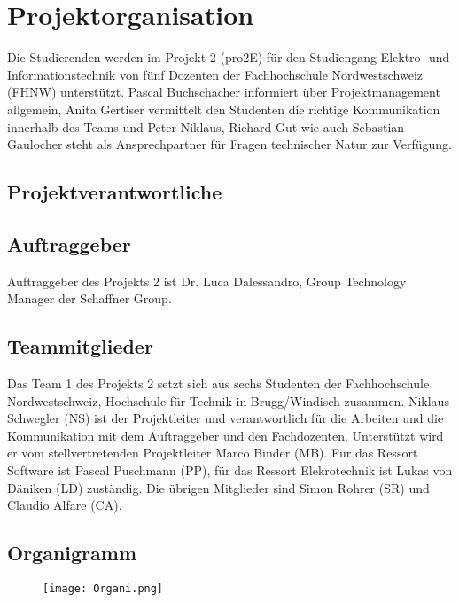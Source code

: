 \section{Projektorganisation}

Die Studierenden werden im Projekt 2 (pro2E) für den Studiengang Elektro- und Informationstechnik von fünf Dozenten der Fachhochschule Nordwestschweiz (FHNW) unterstützt. Pascal Buchschacher informiert über Projektmanagement allgemein, Anita Gertiser vermittelt den Studenten die richtige Kommunikation innerhalb des Teams und Peter Niklaus, Richard Gut  wie auch Sebastian Gaulocher steht als Ansprechpartner für Fragen technischer Natur zur Verfügung.


\subsection{Projektverantwortliche}

\subsection{Auftraggeber}
Auftraggeber des Projekts 2 ist Dr. Luca Dalessandro, Group Technology Manager der Schaffner Group.

\subsection{Teammitglieder}
Das Team 1 des Projekts 2 setzt sich aus sechs Studenten der Fachhochschule Nordwestschweiz, Hochschule für Technik in Brugg/Windisch zusammen. Niklaus Schwegler (NS) ist der Projektleiter und verantwortlich für die Arbeiten und die Kommunikation mit dem Auftraggeber und den Fachdozenten. Unterstützt wird er vom stellvertretenden Projektleiter  Marco  Binder (MB). Für das Ressort Software ist Pascal Puschmann (PP), für das Ressort Elekrotechnik ist Lukas von Däniken (LD) zuständig. Die übrigen Mitglieder sind Simon Rohrer (SR) und Claudio Alfare (CA). 

\subsection{Organigramm}
\begin{figure}[H]
	\centering
	\texttt{[image: Organi.png]}
	\label{fig:Organigramm}
\end{figure}
